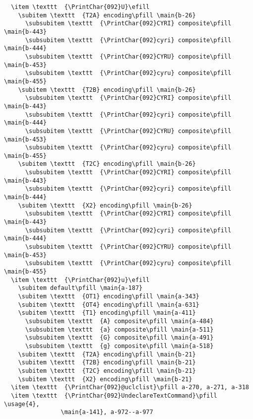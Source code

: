 \documentclass[twoside]{ltxdoc}
\makeatletter
\renewenvironment{theindex}{%
   \@restonecoltrue
   \if@twocolumn\@restonecolfalse\fi
   \columnseprule \z@
   \columnsep 35\p@
   \twocolumn[\index@prologue]%
   \IndexParms
   \let\item\@idxitem
   \ignorespaces
}{\if@restonecol\onecolumn\else\clearpage\fi}
\makeatother
\begin{document}
\begin{theindex}
\begin{figure*}[tp]
    \let\item=\listenvironmentitem
    \expandafter\def \expandafter\MacroFont \expandafter{%
       \MacroFont\footnotesize}
\begin{verbatim}
  \item \texttt  {\PrintChar{092}U}\efill 
    \subitem \texttt  {T2A} encoding\pfill \main{b-26}
      \subsubitem \texttt  {\PrintChar{092}CYRI} composite\pfill \main{b-443}
      \subsubitem \texttt  {\PrintChar{092}cyri} composite\pfill \main{b-444}
      \subsubitem \texttt  {\PrintChar{092}CYRU} composite\pfill \main{b-453}
      \subsubitem \texttt  {\PrintChar{092}cyru} composite\pfill \main{b-455}
    \subitem \texttt  {T2B} encoding\pfill \main{b-26}
      \subsubitem \texttt  {\PrintChar{092}CYRI} composite\pfill \main{b-443}
      \subsubitem \texttt  {\PrintChar{092}cyri} composite\pfill \main{b-444}
      \subsubitem \texttt  {\PrintChar{092}CYRU} composite\pfill \main{b-453}
      \subsubitem \texttt  {\PrintChar{092}cyru} composite\pfill \main{b-455}
    \subitem \texttt  {T2C} encoding\pfill \main{b-26}
      \subsubitem \texttt  {\PrintChar{092}CYRI} composite\pfill \main{b-443}
      \subsubitem \texttt  {\PrintChar{092}cyri} composite\pfill \main{b-444}
    \subitem \texttt  {X2} encoding\pfill \main{b-26}
      \subsubitem \texttt  {\PrintChar{092}CYRI} composite\pfill \main{b-443}
      \subsubitem \texttt  {\PrintChar{092}cyri} composite\pfill \main{b-444}
      \subsubitem \texttt  {\PrintChar{092}CYRU} composite\pfill \main{b-453}
      \subsubitem \texttt  {\PrintChar{092}cyru} composite\pfill \main{b-455}
  \item \texttt  {\PrintChar{092}u}\efill 
    \subitem default\pfill \main{a-187}
    \subitem \texttt  {OT1} encoding\pfill \main{a-343}
    \subitem \texttt  {OT4} encoding\pfill \main{a-631}
    \subitem \texttt  {T1} encoding\pfill \main{a-411}
      \subsubitem \texttt  {A} composite\pfill \main{a-484}
      \subsubitem \texttt  {a} composite\pfill \main{a-511}
      \subsubitem \texttt  {G} composite\pfill \main{a-491}
      \subsubitem \texttt  {g} composite\pfill \main{a-518}
    \subitem \texttt  {T2A} encoding\pfill \main{b-21}
    \subitem \texttt  {T2B} encoding\pfill \main{b-21}
    \subitem \texttt  {T2C} encoding\pfill \main{b-21}
    \subitem \texttt  {X2} encoding\pfill \main{b-21}
  \item \texttt  {\PrintChar{092}@uclclist}\pfill a-270, a-271, a-318
  \item \texttt  {\PrintChar{092}UndeclareTextCommand}\pfill \usage{4}, 
                \main{a-141}, a-972--a-977

\end{verbatim}
\end{figure*}
\end{theindex}
\end{document}
